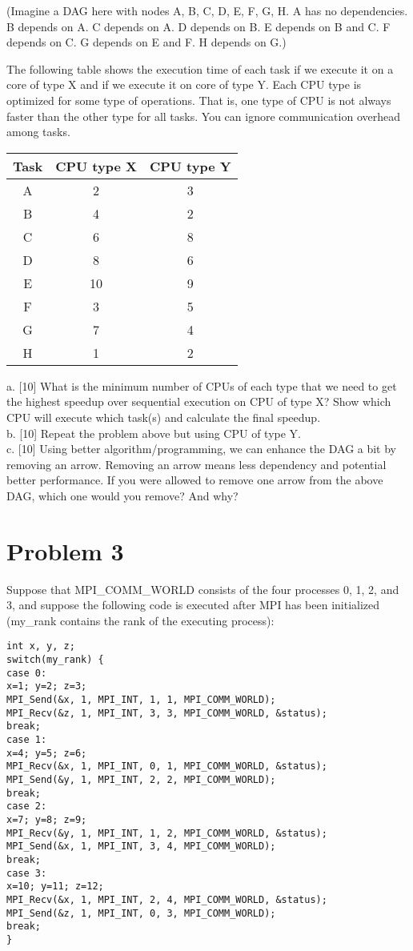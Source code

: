 \documentclass{article}
\begin{document}
(Imagine a DAG here with nodes A, B, C, D, E, F, G, H.  A has no dependencies. B depends on A. C depends on A. D depends on B. E depends on B and C. F depends on C. G depends on E and F. H depends on G.)

The following table shows the execution time of each task if we execute it on a core of type X and if we execute it on core of type Y. Each CPU type is optimized for some type of operations. That is, one type of CPU is not always faster than the other type for all tasks. You can ignore communication overhead among tasks.

\begin{tabular}{|c|c|c|}
\hline
Task & CPU type X & CPU type Y \\
\hline
A & 2 & 3 \\
B & 4 & 2 \\
C & 6 & 8 \\
D & 8 & 6 \\
E & 10 & 9 \\
F & 3 & 5 \\
G & 7 & 4 \\
H & 1 & 2 \\
\hline
\end{tabular}

a. [10] What is the minimum number of CPUs of each type that we need to get the highest speedup over sequential execution on CPU of type X? Show which CPU will execute which task(s) and calculate the final speedup. \\
b. [10] Repeat the problem above but using CPU of type Y. \\
c. [10] Using better algorithm/programming, we can enhance the DAG a bit by removing an arrow. Removing an arrow means less dependency and potential better performance. If you were allowed to remove one arrow from the above DAG, which one would you remove? And why?


\section*{Problem 3}
Suppose that MPI\_COMM\_WORLD consists of the four processes 0, 1, 2, and 3, and suppose the following code is executed after MPI has been initialized (my\_rank contains the rank of the executing process):

\begin{verbatim}
int x, y, z;
switch(my_rank) {
case 0:
x=1; y=2; z=3;
MPI_Send(&x, 1, MPI_INT, 1, 1, MPI_COMM_WORLD);
MPI_Recv(&z, 1, MPI_INT, 3, 3, MPI_COMM_WORLD, &status);
break;
case 1:
x=4; y=5; z=6;
MPI_Recv(&x, 1, MPI_INT, 0, 1, MPI_COMM_WORLD, &status);
MPI_Send(&y, 1, MPI_INT, 2, 2, MPI_COMM_WORLD);
break;
case 2:
x=7; y=8; z=9;
MPI_Recv(&y, 1, MPI_INT, 1, 2, MPI_COMM_WORLD, &status);
MPI_Send(&x, 1, MPI_INT, 3, 4, MPI_COMM_WORLD);
break;
case 3:
x=10; y=11; z=12;
MPI_Recv(&x, 1, MPI_INT, 2, 4, MPI_COMM_WORLD, &status);
MPI_Send(&z, 1, MPI_INT, 0, 3, MPI_COMM_WORLD);
break;
}
\end{verbatim}
\end{document}
